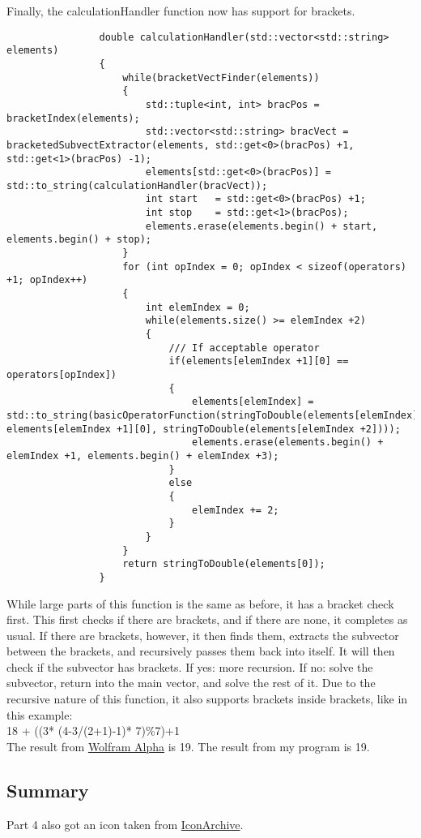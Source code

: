 \documentclass{article}
\begin{document}
			Finally, the calculationHandler function now has support for brackets.
			\begin{lstlisting}
				double calculationHandler(std::vector<std::string> elements)
				{
					while(bracketVectFinder(elements))
					{
						std::tuple<int, int> bracPos = bracketIndex(elements);
						std::vector<std::string> bracVect = bracketedSubvectExtractor(elements, std::get<0>(bracPos) +1, std::get<1>(bracPos) -1);
						elements[std::get<0>(bracPos)] = std::to_string(calculationHandler(bracVect));
						int start   = std::get<0>(bracPos) +1;
						int stop    = std::get<1>(bracPos);
						elements.erase(elements.begin() + start,     elements.begin() + stop);
					}
					for (int opIndex = 0; opIndex < sizeof(operators) +1; opIndex++)
					{
						int elemIndex = 0;
						while(elements.size() >= elemIndex +2)
						{
							/// If acceptable operator
							if(elements[elemIndex +1][0] == operators[opIndex])
							{
								elements[elemIndex] = std::to_string(basicOperatorFunction(stringToDouble(elements[elemIndex]), elements[elemIndex +1][0], stringToDouble(elements[elemIndex +2])));
								elements.erase(elements.begin() + elemIndex +1, elements.begin() + elemIndex +3);
							}
							else
							{
								elemIndex += 2;
							}
						}
					}
					return stringToDouble(elements[0]);
				}
			\end{lstlisting}
			While large parts of this function is the same as before, it has a bracket check first. This first checks if there are brackets, and if there are none, it completes as usual. If there are brackets, however, it then finds them, extracts the subvector between the brackets, and recursively passes them back into itself. It will then check if the subvector has brackets. If yes: more recursion. If no: solve the subvector, return into the main vector, and solve the rest of it. Due to the recursive nature of this function, it also supports brackets inside brackets, like in this example: \\
			18 + ((3* (4-3/(2+1)-1)* 7)\%7)+1 \\
			The result from
			\href{http://www.wolframalpha.com/input/?i=18+\%2B+((3*+(4-3\%2F(2\%2B1)-1)*+7)\%257)\%2B1}{Wolfram Alpha}
			is 19. The result from my program is 19.
		
		
		\subsection{Summary}
			Part 4 also got an icon taken from
			\href{http://www.iconarchive.com/show/sevenesque-icons-by-tristan-edwards/Calculator-icon.html}{IconArchive}.
\end{document}

